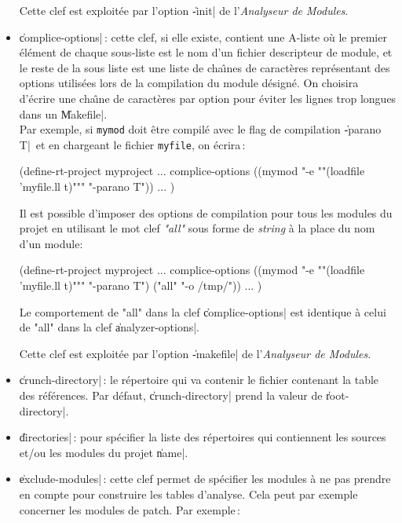 \begin{itemize}
Cette clef est exploit\'{e}e par l'option \|-init| de l'{\em Analyseur de
Modules}. 

\item {\Large \|complice-options|}\,: cette clef, si elle existe,
contient une A-liste o\`{u} le premier \'{e}l\'{e}ment de chaque sous-liste est le
nom d'un fichier descripteur de module, et le reste de la sous liste
est une liste de cha\^{\i}nes de caract\`{e}res repr\'{e}sentant des options
utilis\'{e}es lors de la compilation du module d\'{e}sign\'{e}. On choisira
d'\'{e}crire une cha\^{\i}ne de caract\`{e}res par option pour \'{e}viter les
lignes trop longues dans un \|Makefile|.\\
Par exemple, si {\tt mymod} doit \^{e}tre
compil\'{e} avec le flag de compilation \|-parano T|\, et en chargeant le
fichier {\tt myfile}, on \'{e}crira\,:
\begin{Code*}
(define-rt-project myproject
  ...
  complice-options ((mymod "-e ""(loadfile 'myfile.ll t)"""
                           "-parano T"))
  ...
)
\end{Code*}
Il est possible d'imposer des options de compilation pour tous les modules
du projet en utilisant le mot clef {\em "all"} sous forme de {\it
string} \`{a} la place du nom d'un module:
\begin{Code*}
(define-rt-project myproject
  ...
  complice-options ((mymod "-e ""(loadfile 'myfile.ll t)"""
                           "-parano T")
                    ("all" "-o /tmp/"))
  ...
)
\end{Code*}
Le comportement de "all" dans la clef \|complice-options| est
identique \`{a} celui de "all" dans la clef \|analyzer-options|.

Cette clef est exploit\'{e}e par l'option \|-makefile| de l'{\em Analyseur de
Modules}.

\item {\Large \|crunch-directory|}\,: le r\'{e}pertoire qui va contenir
le fichier contenant la table des r\'{e}f\'{e}rences. Par d\'{e}faut,
\|crunch-directory| prend la valeur de \|root-directory|.

\item {\Large \|directories|}\,: pour sp\'{e}cifier la liste des
r\'{e}pertoires qui contiennent les sources et/ou les modules du projet
\|name|.

\item {\Large \|exclude-modules|}\,: cette clef permet de sp\'{e}cifier les
modules \`{a} ne pas prendre en compte
pour construire les tables d'analyse. Cela
peut par exemple concerner les modules de patch. Par exemple\,:


\end{itemize}
